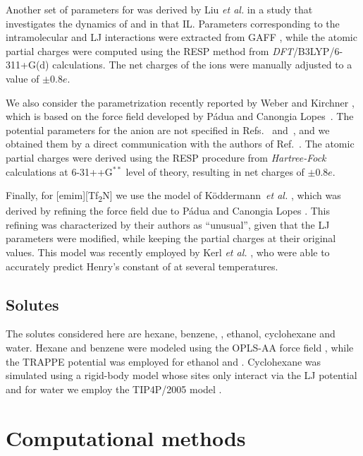\documentclass[3p,twocolumn]{elsarticle}
\begin{document}
Another set of parameters for \ce{[emim][B(CN)_4]} was derived by Liu \textit{et al.} \cite{Liu_2014} in a study that investigates the dynamics of  and  in that IL. Parameters corresponding to the intramolecular and LJ interactions were extracted from GAFF \cite{Wang_2004}, while the atomic partial charges were computed using the RESP method \cite{Bayly_1993} from \textit{DFT}/B3LYP/6-311+G(d) calculations. The net charges of the ions were manually adjusted to a value of $\pm$0.8$e$.

We also consider the parametrization recently reported by Weber and Kirchner \cite{Weber_2016}, which is based on the force field developed by P{\'{a}}dua and Canongia Lopes~\cite{Canongia_Lopes_2006}. The potential parameters for the anion are not specified in Refs.~ and~, and we obtained them by a direct communication with the authors of Ref.~. The atomic partial charges were derived using the RESP procedure from \textit{Hartree-Fock} calculations at 6-31++G$^{\ast \ast}$ level of theory, resulting in net charges of $\pm$0.8$e$.

Finally, for [emim][Tf\textsubscript{2}N] we use the model of K\"{o}ddermann~\textit{et al.} \cite{K_ddermann_2007}, which was derived by refining the force field due to P{\'{a}}dua and Canongia Lopes \cite{Canongia_Lopes_2006}. This refining was characterized by their authors as ``unusual'', given that the LJ parameters were modified, while keeping the partial charges at their original values. This model was recently employed by Kerl \textit{et al.} \cite{Kerl__2017}, who were able to accurately predict Henry's constant of  at several temperatures.

\subsection{Solutes}
\label{sec:force_field_sol}

The solutes considered here are hexane, benzene, , ethanol, cyclohexane and water. Hexane and benzene were modeled using the OPLS-AA force field \cite{Jorgensen_1996}, while the TRAPPE potential \cite{Chen_2001,Potoff_2001} was employed for ethanol and . Cyclohexane was simulated using a rigid-body model \cite{munoz2015lennard} whose sites only interact via the LJ potential and for water we employ the TIP4P/2005 model \cite{Abascal_2005,Vega_2011}. 

\section{Computational methods}
\label{sec:sim_details}
\end{document}
